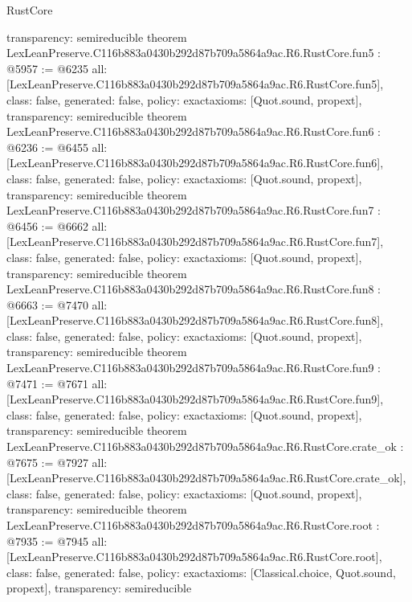 \begin{lexlean}{RustCore}
\begin{coremodule}
{  transparency: semireducible
}
theorem LexLeanPreserve.C116b883a0430b292d87b709a5864a9ac.R6.RustCore.fun5 : @5957 := @6235 {
  all: [LexLeanPreserve.C116b883a0430b292d87b709a5864a9ac.R6.RustCore.fun5],
  class: false,
  generated: false,
  policy: exact{axioms: [Quot.sound, propext]},
  transparency: semireducible
}
theorem LexLeanPreserve.C116b883a0430b292d87b709a5864a9ac.R6.RustCore.fun6 : @6236 := @6455 {
  all: [LexLeanPreserve.C116b883a0430b292d87b709a5864a9ac.R6.RustCore.fun6],
  class: false,
  generated: false,
  policy: exact{axioms: [Quot.sound, propext]},
  transparency: semireducible
}
theorem LexLeanPreserve.C116b883a0430b292d87b709a5864a9ac.R6.RustCore.fun7 : @6456 := @6662 {
  all: [LexLeanPreserve.C116b883a0430b292d87b709a5864a9ac.R6.RustCore.fun7],
  class: false,
  generated: false,
  policy: exact{axioms: [Quot.sound, propext]},
  transparency: semireducible
}
theorem LexLeanPreserve.C116b883a0430b292d87b709a5864a9ac.R6.RustCore.fun8 : @6663 := @7470 {
  all: [LexLeanPreserve.C116b883a0430b292d87b709a5864a9ac.R6.RustCore.fun8],
  class: false,
  generated: false,
  policy: exact{axioms: [Quot.sound, propext]},
  transparency: semireducible
}
theorem LexLeanPreserve.C116b883a0430b292d87b709a5864a9ac.R6.RustCore.fun9 : @7471 := @7671 {
  all: [LexLeanPreserve.C116b883a0430b292d87b709a5864a9ac.R6.RustCore.fun9],
  class: false,
  generated: false,
  policy: exact{axioms: [Quot.sound, propext]},
  transparency: semireducible
}
theorem LexLeanPreserve.C116b883a0430b292d87b709a5864a9ac.R6.RustCore.crate_ok : @7675 := @7927 {
  all: [LexLeanPreserve.C116b883a0430b292d87b709a5864a9ac.R6.RustCore.crate_ok],
  class: false,
  generated: false,
  policy: exact{axioms: [Quot.sound, propext]},
  transparency: semireducible
}
theorem LexLeanPreserve.C116b883a0430b292d87b709a5864a9ac.R6.RustCore.root : @7935 := @7945 {
  all: [LexLeanPreserve.C116b883a0430b292d87b709a5864a9ac.R6.RustCore.root],
  class: false,
  generated: false,
  policy: exact{axioms: [Classical.choice, Quot.sound, propext]},
  transparency: semireducible
}


\end{coremodule}
\end{lexlean}
